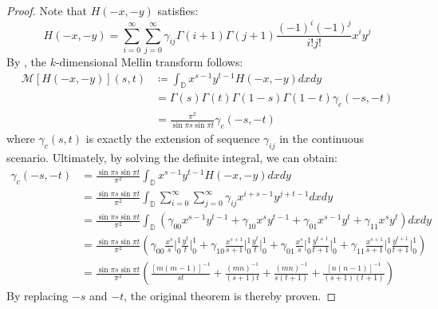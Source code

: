 \documentclass{article}
\begin{document}
\begin{proof}
Note that $H(-x, -y)$ satisfies:
\begin{equation}
    H(-x, -y) = \sum_{i=0}^{\infty}\sum_{j=0}^{\infty}\gamma_{ij}\Gamma(i+1)\Gamma(j+1)\frac{(-1)^i(-1)^j}{i!j!}x^iy^j
\end{equation}
By , the $k$-dimensional Mellin transform follows:
\begin{equation}
    \begin{aligned}
        \mathcal{M}[H(-x, -y)](s, t) & \coloneqq \int_{\mathbb{D}} x^{s-1}y^{t-1} H(-x, -y) dxdy \\
        & = \Gamma(s)\Gamma(t)\Gamma(1-s)\Gamma(1-t) \gamma_c(-s, -t)\\
        & = \frac{\pi^2}{\sin\pi s \sin\pi t} \gamma_c(-s, -t)
    \end{aligned}
\end{equation}
where $\gamma_c(s, t)$ is exactly the extension of sequence $\gamma_{ij}$ in the continuous scenario.
Ultimately, by solving the definite integral, we can obtain:
\begin{equation}
    \begin{aligned}
        \gamma_c(-s, -t) & = \frac{\sin\pi s \sin\pi t}{\pi^2} \int_{\mathbb{D}} x^{s-1}y^{t-1} H(-x, -y) dxdy \\
        & = \frac{\sin\pi s \sin\pi t}{\pi^2} \int_{\mathbb{D}} \sum_{i=0}^{\infty}\sum_{j=0}^{\infty}\gamma_{ij}x^{i+s-1}y^{j+t-1} dxdy \\
        & = \frac{\sin\pi s \sin\pi t}{\pi^2} \int_{\mathbb{D}} (\gamma_{00}x^{s-1}y^{t-1} + \gamma_{10}x^{s}y^{t-1} + \gamma_{01}x^{s-1}y^{t} + \gamma_{11}x^sy^t) dxdy \\
        & = \frac{\sin\pi s \sin\pi t}{\pi^2} \left(\gamma_{00}\frac{x^s}{s}\bigg|_0^1\frac{y^t}{t}\bigg|_0^1 + \gamma_{10}\frac{x^{s+1}}{s+1}\bigg|_0^1\frac{y^t}{t}\bigg|_0^1 + \gamma_{01}\frac{x^s}{s}\bigg|_0^1\frac{y^{t+1}}{t+1}\bigg|_0^1 + \gamma_{11}\frac{x^{s+1}}{s+1}\bigg|_0^1\frac{y^{t+1}}{t+1}\bigg|_0^1 \right) \\
        & = \frac{\sin\pi s \sin\pi t}{\pi^2} \left(\frac{[m(m-1)]^{-1}}{st}+\frac{(mn)^{-1}}{(s+1)t}+\frac{(mn)^{-1}}{s(t+1)}+\frac{[n(n-1)]^{-1}}{(s+1)(t+1)} \right)
    \end{aligned}
\end{equation}
By replacing $-s$ and $-t$, the original theorem is thereby proven.
\end{proof}
\end{document}
